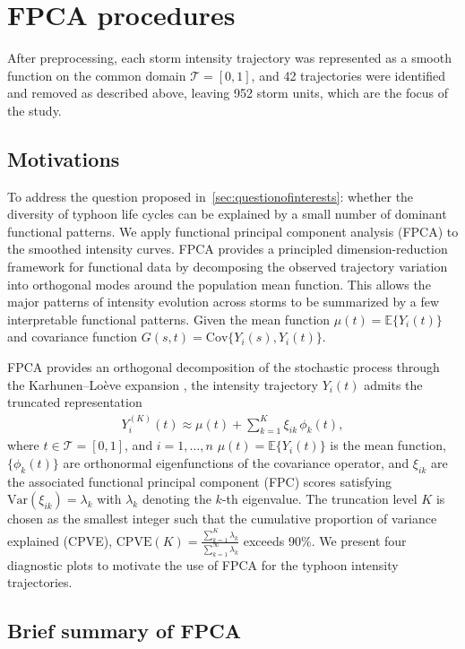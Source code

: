 \documentclass{article}
\begin{document}
\section{FPCA procedures}
\label{sec:fpca}
After preprocessing, each storm intensity trajectory was represented as a smooth function on the common domain $\mathcal{T}=[0,1]$, and 42 trajectories were identified and removed as described above, leaving 952 storm units, which are the focus of the study.

\subsection{Motivations}
To address the question proposed in~\ref{sec:questionofinterests}: whether the diversity of typhoon life cycles can be explained by a small number of dominant functional patterns. We apply functional principal component analysis (FPCA) to the smoothed intensity curves. FPCA provides a principled dimension-reduction framework for functional data by decomposing the observed trajectory variation into orthogonal modes around the population mean function. This allows the major patterns of intensity evolution across storms to be summarized by a few interpretable functional patterns. Given the mean function $\mu(t)=\mathbb{E}\{Y_i(t)\}$ and covariance function $G(s,t)=\mathrm{Cov}\{Y_i(s),Y_i(t)\}$.

FPCA provides an orthogonal decomposition of the stochastic process through the Karhunen--Lo\`eve expansion \cite{karhunen1947, loeve1946, ramsay2005}, the intensity trajectory $Y_i(t)$ admits the truncated representation
\begin{align}
Y_i^{(K)}(t) \approx \mu(t)+\sum_{k=1}^{K}\xi_{ik}\,\phi_k(t), 
\end{align}
where $t \in \mathcal{T}=[0,1]$, and $i=1,\dots,n$ $\mu(t)=\mathbb{E}\{Y_i(t)\}$ is the mean function, $\{\phi_k(t)\}$ are orthonormal eigenfunctions of the covariance operator, and $\xi_{ik}$ are the associated functional principal component (FPC) scores satisfying $\mathrm{Var}(\xi_{ik})=\lambda_k$ with $\lambda_k$ denoting the $k$-th eigenvalue. The truncation level $K$ is chosen as the smallest integer such that the cumulative proportion of variance explained (CPVE), $\mathrm{CPVE}(K) = \frac{\sum_{k=1}^{K}\lambda_k} {\sum_{k=1}^{\infty}\lambda_k}$ exceeds $90\%$.  We present four diagnostic plots to motivate the use of FPCA for the typhoon intensity trajectories. 

\subsection{Brief summary of FPCA}
\end{document}
